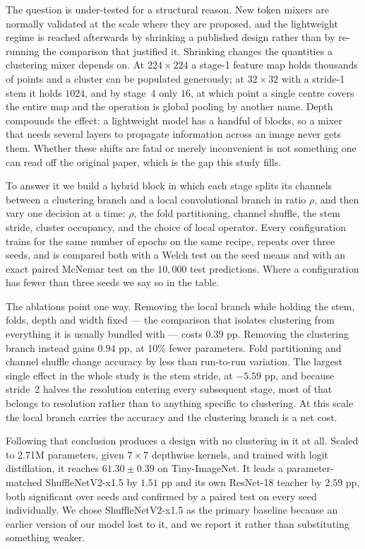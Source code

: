 The question is under-tested for a structural reason. New token mixers are
normally validated at the scale where they are proposed, and the lightweight
regime is reached afterwards by shrinking a published design rather than by
re-running the comparison that justified it. Shrinking changes the quantities
a clustering mixer depends on. At $224\times224$ a stage-1 feature map holds
thousands of points and a cluster can be populated generously; at $32\times32$
with a stride-1 stem it holds $1024$, and by stage~4 only $16$, at which point
a single centre covers the entire map and the operation is global pooling by
another name. Depth compounds the effect: a lightweight model has a handful of
blocks, so a mixer that needs several layers to propagate information across
an image never gets them. Whether these shifts are fatal or merely
inconvenient is not something one can read off the original paper, which is
the gap this study fills.

To answer it we build a hybrid block in which each stage splits its channels
between a clustering branch and a local convolutional branch in ratio $\rho$,
and then vary one decision at a time: $\rho$, the fold partitioning, channel
shuffle, the stem stride, cluster occupancy, and the choice of local operator.
Every configuration trains for the same number of epochs on the same recipe,
repeats over three seeds, and is compared both with a Welch test on the seed
means and with an exact paired McNemar test on the $10{,}000$ test
predictions. Where a configuration has fewer than three seeds we say so in the
table.

The ablations point one way. Removing the local branch while holding the stem,
folds, depth and width fixed --- the comparison that isolates clustering from
everything it is usually bundled with --- costs $0.39$ pp. Removing the
clustering branch instead gains $0.94$ pp, at 10\% fewer parameters. Fold
partitioning and channel shuffle change accuracy by less than run-to-run
variation. The largest single effect in the whole study is the stem stride, at
$-5.59$ pp, and because stride~2 halves the resolution entering every
subsequent stage, most of that belongs to resolution rather than to anything
specific to clustering. At this scale the local branch carries the accuracy
and the clustering branch is a net cost.

Following that conclusion produces a design with no clustering in it at all.
Scaled to 2.71M parameters, given $7\times7$ depthwise kernels, and trained
with logit distillation, it reaches $61.30 \pm 0.39$ on Tiny-ImageNet. It
leads a parameter-matched ShuffleNetV2-x1.5 \cite{shufflenetv2} by $1.51$ pp
and its own ResNet-18 teacher by $2.59$ pp, both significant over seeds and
confirmed by a paired test on every seed individually. We chose
ShuffleNetV2-x1.5 as the primary baseline because an earlier version of our
model lost to it, and we report it rather than substituting something weaker.

